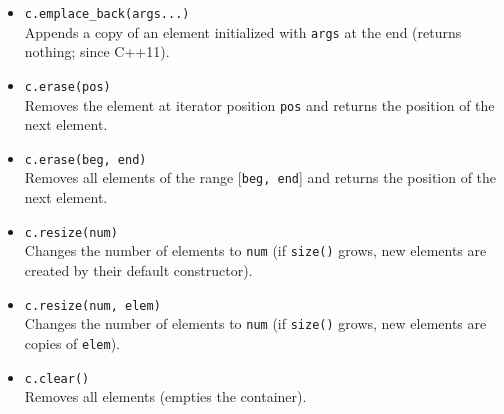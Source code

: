 \documentclass{report}
\begin{document}
\begin{itemize}
    \item \texttt{c.emplace\_back(args...)} \\
          Appends a copy of an element initialized with \texttt{args} at the end (returns nothing; since C++11).
          
    \item \texttt{c.erase(pos)} \\
          Removes the element at iterator position \texttt{pos} and returns the position of the next element.
          
    \item \texttt{c.erase(beg, end)} \\
          Removes all elements of the range [\texttt{beg, end}] and returns the position of the next element.
          
    \item \texttt{c.resize(num)} \\
          Changes the number of elements to \texttt{num} (if \texttt{size()} grows, new elements are created by their default constructor).
          
    \item \texttt{c.resize(num, elem)} \\
          Changes the number of elements to \texttt{num} (if \texttt{size()} grows, new elements are copies of \texttt{elem}).
          
    \item \texttt{c.clear()} \\
          Removes all elements (empties the container).
\end{itemize}

\pagebreak 
{}
\bigbreak \noindent 
\end{document}
